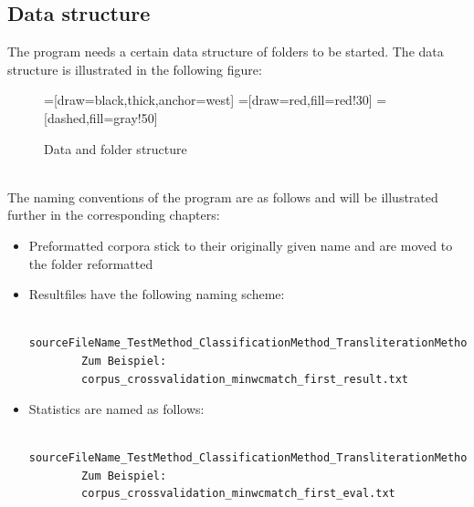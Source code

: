 \documentclass[10pt,a4paper,titlepage]{report}
\begin{document}
	\subsection{Data structure}
	The program needs a certain data structure of folders to be started. The data structure is illustrated in the following figure:
	\begin{figure}[htb]
		\centering
		=[draw=black,thick,anchor=west]
		=[draw=red,fill=red!30]
		=[dashed,fill=gray!50]
		\caption{Data and folder structure}
	\end{figure}
	\\The naming conventions of the program are as follows and will be illustrated further in the corresponding chapters:
	\begin{itemize}
		\item Preformatted corpora stick to their originally given name and are moved to the folder reformatted
		\item Resultfiles have the following naming scheme:
		\begin{lstlisting}
		sourceFileName_TestMethod_ClassificationMethod_TransliterationMethod_result.txt
		Zum Beispiel:
		corpus_crossvalidation_minwcmatch_first_result.txt
		\end{lstlisting}
		\item Statistics are named as follows:
		\begin{lstlisting}
		sourceFileName_TestMethod_ClassificationMethod_TransliterationMethod_eval.txt
		Zum Beispiel:
		corpus_crossvalidation_minwcmatch_first_eval.txt
		\end{lstlisting}
	\end{itemize}
\end{document}
